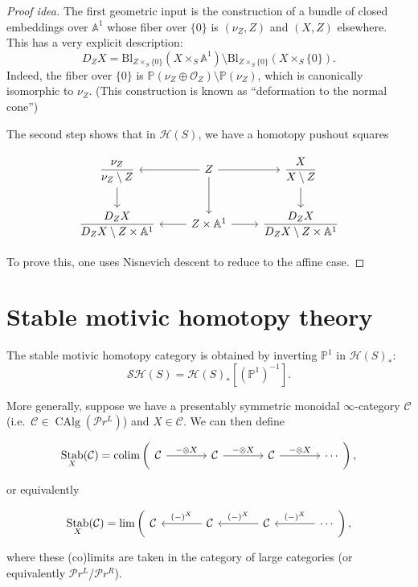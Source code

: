 \documentclass{shortart}
\theoremstyle{definition}
\newcommand\SH{\mathcal{SH}}
\renewcommand\H{\mathcal{H}}
\renewcommand\P{\mathbb{P}}
\newcommand\A{\mathbb{A}}
\newcommand\Bl{\mathrm{Bl}}
\newcommand\PrL{\mathcal{P}r^L}
\newcommand\PrR{\mathcal{P}r^R}
\DeclareMathOperator\CAlg{CAlg}
\DeclareMathOperator\Stab{Stab}
\DeclareMathOperator*\colim{colim}
\begin{document}
\begin{proof}[Proof idea]
  The first geometric input is the construction of a bundle of closed embeddings over $\A^1$ whose fiber over $\{0\}$ is $(\nu_Z, Z)$ and $(X, Z)$ elsewhere. This has a very explicit description:
  \[
    D_ZX = \Bl_{Z \times_S \{0\}} (X \times_S \A^1) \setminus \Bl_{Z \times_S \{0\}} (X \times_S \{0\}).
  \]
  Indeed, the fiber over $\{0\}$ is $\P(\nu_Z \oplus \mathcal{O}_Z) \setminus \P(\nu_Z)$, which is canonically isomorphic to $\nu_Z$. (This construction is known as ``deformation to the normal cone'')

  The second step shows that in $\H(S)$, we have a homotopy pushout squares
  \begin{useimager}
    \[
      \begin{tikzcd}
        \dfrac{\nu_Z}{\nu_Z \setminus Z} \ar[d] & Z \ar[r] \ar[l] \ar[d] & \dfrac{X}{X \setminus Z} \ar[d]\\
        \dfrac{D_ZX}{D_ZX \setminus Z \times \A^1} & Z \times \A^1 \ar[l] \ar[r] & \dfrac{D_ZX}{D_Z X\setminus Z \times \A^1}
      \end{tikzcd}
    \]
  \end{useimager}
  To prove this, one uses Nisnevich descent to reduce to the affine case.
\end{proof}

\section{Stable motivic homotopy theory}\label{chapter:stable}
The stable motivic homotopy category is obtained by inverting $\P^1$ in $\H(S)_*$:
\[
  \SH(S) = \H(S)_*[(\P^1)^{-1}].
\]

More generally, suppose we have a presentably symmetric monoidal $\infty$-category $\mathcal{C}$ (i.e.\ $\mathcal{C} \in \CAlg(\PrL)$) and $X \in \mathcal{C}$. We can then define
\begin{useimager}
  \[
    \Stab_X(\mathcal{C}) = \colim \left(\begin{tikzcd}[column sep=large]
        \mathcal{C} \ar[r, "-\otimes X"] &
        \mathcal{C} \ar[r, "-\otimes X"] &
        \mathcal{C} \ar[r, "-\otimes X"] &
        \cdots
    \end{tikzcd}\right),
  \]
\end{useimager}
or equivalently
\begin{useimager}
  \[
    \Stab_X(\mathcal{C}) = \lim \left(\begin{tikzcd}[column sep=large]
        \mathcal{C} &
        \mathcal{C} \ar[l, "(-)^X"'] &
        \mathcal{C} \ar[l, "(-)^X"'] &
        \cdots \ar[l, "(-)^X"']
      \end{tikzcd}
    \right),
  \]
\end{useimager}
where these (co)limits are taken in the category of large categories (or equivalently $\PrL$/$\PrR$).
\end{document}
